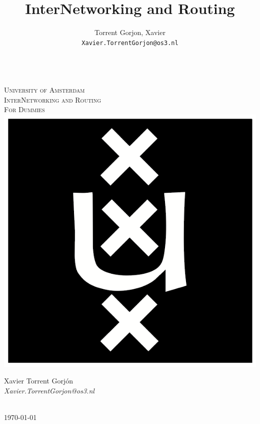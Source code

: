 \documentclass{article}
\author{
  Torrent Gorjon, Xavier\\
  \texttt{Xavier.TorrentGorjon@os3.nl}
}
\title{InterNetworking and Routing}
\begin{document}
\begin{titlepage}
\center
\textsc{}\\[1cm]
\textsc{\LARGE University of Amsterdam}\\[1.5cm]

\textsc{\Large InterNetworking and Routing}\\[0.5cm]

\textsc{\Large For Dummies}\\[0.5cm]

\includegraphics[scale=1]{images/uva.png}\\[3cm]


\begin{minipage}{0.4 \textwidth}
\begin{center}
Xavier Torrent Gorj\'{o}n \\[0.5cm]
\emph{Xavier.TorrentGorjon@os3.nl}\\[0.5cm]
\end{center}
\end{minipage}
\hfill\\[0.5cm]

{\large \today} 


\end{titlepage}


\newpage

\tableofcontents
\end{document}
